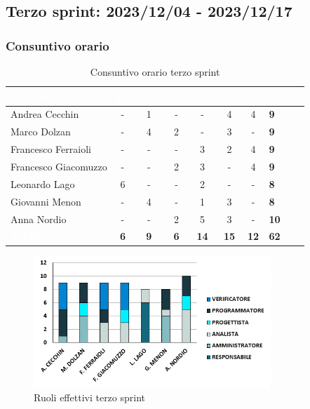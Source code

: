 \subsection{Terzo sprint: 2023/12/04 - 2023/12/17}

\subsubsection{Consuntivo orario}
{
\setlength{\tabcolsep}{10pt}
\renewcommand{\arraystretch}{1.5}
\begin{table}[h!]
    \centering
    \begin{tabularx}{\textwidth}{| l | c | c | c | c | c | c | X |}
        \hline
        \rowcolor{headerrow} \textbf{\textcolor{white}{Membro}} & \textbf{\textcolor{white}{R.}} & \textbf{\textcolor{white}{Am.}} & \textbf{\textcolor{white}{Pj.}} & \textbf{\textcolor{white}{An.}} & \textbf{\textcolor{white}{Pg.}} & \textbf{\textcolor{white}{V.}} & \textbf{\textcolor{white}{Totale}} \\
        \hline
        Andrea Cecchin & - & 1 & - & - & 4 & 4 & \textbf{9} \\
        \hline
        Marco Dolzan & - & 4 & 2 & - & 3 & - & \textbf{9} \\
        \hline
        Francesco Ferraioli & - & - & - & 3 & 2 & 4 & \textbf{9} \\
        \hline  
        Francesco Giacomuzzo & - & - & 2 & 3 & - & 4 & \textbf{9} \\
        \hline
        Leonardo Lago & 6 & - & - & 2 & - & - & \textbf{8} \\
        \hline
        Giovanni Menon & - & 4 & - & 1 & 3 & - & \textbf{8} \\
        \hline
        Anna Nordio & - & - & 2 & 5 & 3 & - & \textbf{10} \\
        \hline
    \cellcolor{headerrow} \textbf{\textcolor{white}{Totale}} & \textbf{6} & \textbf{9} & \textbf{6} & \textbf{14} & \textbf{15} & \textbf{12} & \textbf{62} \\
        \hline
    \end{tabularx} 
    \caption{Consuntivo orario terzo sprint}
    \label{tab:consuntivoorarioterzosprint}
\end{table}
}

\begin{figure}[h!]
    \centering
    \includegraphics[width=0.8\textwidth]{cons3ruoli.png}
    \caption{Ruoli effettivi terzo sprint}
    \label{fig:consuntivoorarioterzosprint}
\end{figure}

